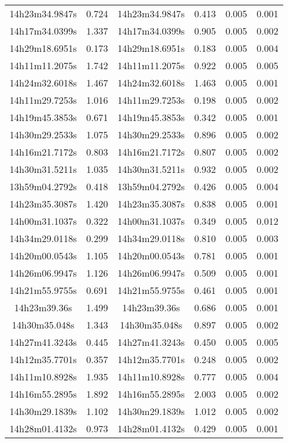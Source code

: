 \begin{table}
\begin{tabular}{cccccc}
14h23m34.9847s & 0.724 & 14h23m34.9847s & 0.413 & 0.005 & 0.001 \\
14h17m34.0399s & 1.337 & 14h17m34.0399s & 0.905 & 0.005 & 0.002 \\
14h29m18.6951s & 0.173 & 14h29m18.6951s & 0.183 & 0.005 & 0.004 \\
14h11m11.2075s & 1.742 & 14h11m11.2075s & 0.922 & 0.005 & 0.005 \\
14h24m32.6018s & 1.467 & 14h24m32.6018s & 1.463 & 0.005 & 0.001 \\
14h11m29.7253s & 1.016 & 14h11m29.7253s & 0.198 & 0.005 & 0.002 \\
14h19m45.3853s & 0.671 & 14h19m45.3853s & 0.342 & 0.005 & 0.001 \\
14h30m29.2533s & 1.075 & 14h30m29.2533s & 0.896 & 0.005 & 0.002 \\
14h16m21.7172s & 0.803 & 14h16m21.7172s & 0.807 & 0.005 & 0.002 \\
14h30m31.5211s & 1.035 & 14h30m31.5211s & 0.932 & 0.005 & 0.002 \\
13h59m04.2792s & 0.418 & 13h59m04.2792s & 0.426 & 0.005 & 0.004 \\
14h23m35.3087s & 1.420 & 14h23m35.3087s & 0.838 & 0.005 & 0.001 \\
14h00m31.1037s & 0.322 & 14h00m31.1037s & 0.349 & 0.005 & 0.012 \\
14h34m29.0118s & 0.299 & 14h34m29.0118s & 0.810 & 0.005 & 0.003 \\
14h20m00.0543s & 1.105 & 14h20m00.0543s & 0.781 & 0.005 & 0.001 \\
14h26m06.9947s & 1.126 & 14h26m06.9947s & 0.509 & 0.005 & 0.001 \\
14h21m55.9755s & 0.691 & 14h21m55.9755s & 0.461 & 0.005 & 0.001 \\
14h23m39.36s & 1.499 & 14h23m39.36s & 0.686 & 0.005 & 0.001 \\
14h30m35.048s & 1.343 & 14h30m35.048s & 0.897 & 0.005 & 0.002 \\
14h27m41.3243s & 0.445 & 14h27m41.3243s & 0.450 & 0.005 & 0.005 \\
14h12m35.7701s & 0.357 & 14h12m35.7701s & 0.248 & 0.005 & 0.002 \\
14h11m10.8928s & 1.935 & 14h11m10.8928s & 0.777 & 0.005 & 0.004 \\
14h16m55.2895s & 1.892 & 14h16m55.2895s & 2.003 & 0.005 & 0.002 \\
14h30m29.1839s & 1.102 & 14h30m29.1839s & 1.012 & 0.005 & 0.002 \\
14h28m01.4132s & 0.973 & 14h28m01.4132s & 0.429 & 0.005 & 0.001 \\

\end{tabular}
\end{table}
